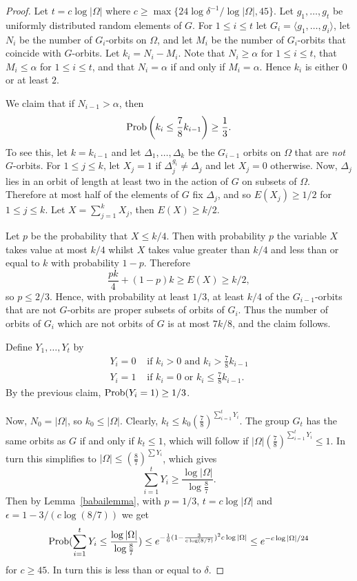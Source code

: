\begin{proof}
Let $t = c \log |\Omega|$ where 
$c \geq \max\{24 \log \delta^{-1}/\log |\Omega|, 45\}$.
Let $g_1, \ldots, g_t$ be uniformly distributed random elements 
of $G$. For $1 \leq i \leq t$ let 
$G_i = \langle g_1, \ldots, g_i \rangle$, 
let $N_i$ be the number of $G_i$-orbits on $\Omega$, 
and let $M_i$ be the 
number of $G_i$-orbits that coincide with $G$-orbits. 
Let $k_i = N_i - M_i$.
Note that $N_i \geq \alpha$ for $1 \leq i \leq t$, 
that $M_i \leq \alpha$ for $1 \leq i \leq t$, and
that $N_i = \alpha$ if and only if $M_i = \alpha$. 
Hence $k_i$ is either $0$ or at least $2$.

We claim that if $N_{i-1} > \alpha$, then 
\[
\Pro\left(k_i \leq \frac{7}{8}k_{i-1}\right) \geq \frac{1}{3}.
\]
To see this,  let $k = k_{i-1}$ and 
let $\Delta_1, \ldots, \Delta_k$ be 
the $G_{i-1}$ orbits on $\Omega$ that are 
\emph{not} $G$-orbits. For  $1 \leq j \leq k$, 
let $X_j = 1$ if $\Delta_j^{g_i} \neq \Delta_j$ 
and let $X_j = 0$ otherwise. 
Now,  $\Delta_j$ lies 
in an orbit of length at least two in the action 
of $G$ on subsets of $\Omega$. Therefore at most half of the 
elements of $G$ fix $\Delta_j$, and 
so $E(X_j) \geq 1/2$ for $1 \leq j \leq k$. Let $X = \sum_{j = 1}^{k} X_j$, then
$E(X)  \geq k/2$. 

Let $p$ be the probability that $X \leq k/4$. Then with probability $p$
the 
variable $X$ takes value at most $k/4$ whilst $X$
takes value greater than $k/4$ and less than or equal to $k$ with 
probability $1-p$. Therefore
\[
\frac{pk}{4} + (1-p) k \geq E(X) \geq k/2,
\]
so $p \leq 2/3$.
Hence, with probability at least $1/3$, at 
least $k/4$ of the $G_{i-1}$-orbits that are not $G$-orbits 
are proper subsets of orbits of $G_{i}$. Thus
 the number of orbits of $G_{i}$ which are 
not orbits of $G$ is at most $7k/8$, and the claim follows. 

Define $Y_1, \ldots, Y_t$ by 
\[\begin{array}{ll}
Y_i = 0 & \mbox{ if $k_i > 0$ and }k_i > \frac{7}{8}k_{i-1} \\
Y_i = 1 & \mbox{ if $k_i = 0$ or }k_i  \leq \frac{7}{8}k_{i-1}. \end{array}\]
By the previous claim, $\Pro(Y_i = 1) \geq 1/3$. 

Now, $N_0 = |\Omega|$, so $k_0 \leq |\Omega|$. 
Clearly,  $k_t \leq k_0 \left(\frac{7}{8}\right)^{\sum_{i = 1}^t Y_i}$. 
The group $G_t$ has the same orbits as $G$ if 
and only if $k_t \leq 1$, which will follow if 
$|\Omega| \left( \frac{7}{8} \right)^{\sum_{i = 1}^t Y_i} \leq 1$. 
In turn this simplifies to 
$|\Omega| \leq \left( \frac{8}{7} \right)^{\sum Y_i}$, which gives
\[
\sum_{i = 1}^t Y_i \geq \frac{ \log |\Omega|}{ \log \frac{8}{7}}.
\]
Then by Lemma~\ref{babailemma}, with $p = 1/3$, $t = c \log |\Omega|$ and $\epsilon = 1 - 3/(c \log (8/7))$ we get %
$$\Pro(\sum_{i = 1}^t Y_i \leq \frac{\log 
|\Omega|}{\log \frac{8}{7}}) \leq e^{-\frac{1}{6}(1- \frac{3}{c \log (8/7)})^2 c \log |\Omega|} \leq e^{- 
c \log |\Omega|/24}$$ for $c \geq 45$. 
In turn this is less than or equal to $\delta$.  
\end{proof}
 
